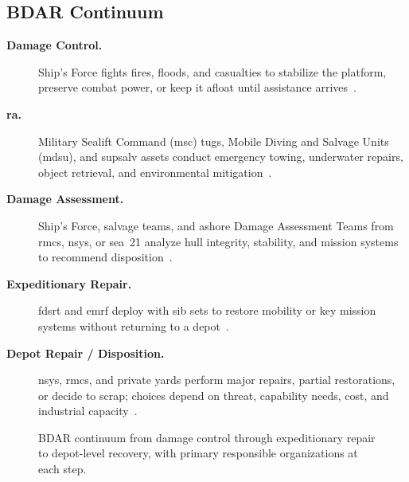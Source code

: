 \documentclass[../main.tex]{subfiles}
\begin{document}
\subsection{BDAR Continuum}
\begin{description}
  \item[\textbf{Damage Control.}] Ship's Force fights fires, floods, and casualties to stabilize the platform, preserve combat power, or keep it afloat until assistance arrives~\autocite{edo-4-1-6-bdar-2025}.
\item[\textbf{\ac{ra}.}] Military Sealift Command (\ac{msc}) tugs, Mobile Diving and Salvage Units (\ac{mdsu}), and \ac{supsalv} assets conduct emergency towing, underwater repairs, object retrieval, and environmental mitigation~\autocite{NAVSEA-4740-2H}.
\item[\textbf{Damage Assessment.}] Ship's Force, salvage teams, and ashore Damage Assessment Teams from \ac{rmc}s, \acp{nsy}, or \ac{sea}~21 analyze hull integrity, stability, and mission systems to recommend disposition~\autocite{edo-4-1-6-bdar-2025}.
  \item[\textbf{Expeditionary Repair.}] \ac{fdsrt} and \ac{emrf} deploy with \ac{sib} sets to restore mobility or key mission systems without returning to a depot~\autocite{CPF-MSP-PLANORD-2023,edo-4-1-6-bdar-2025}.
\item[\textbf{Depot Repair / Disposition.}] \acp{nsy}, \ac{rmc}s, and private yards perform major repairs, partial restorations, or decide to scrap; choices depend on threat, capability needs, cost, and industrial capacity~\autocite{edo-4-1-6-bdar-2025}.
\end{description}

\begin{figure}[htbp]
  \centering
  \caption[BDAR continuum]{BDAR continuum from damage control through expeditionary repair to depot-level recovery, with primary responsible organizations at each step.}
  \label{fig:bdar-continuum}
\end{figure}
\end{document}

